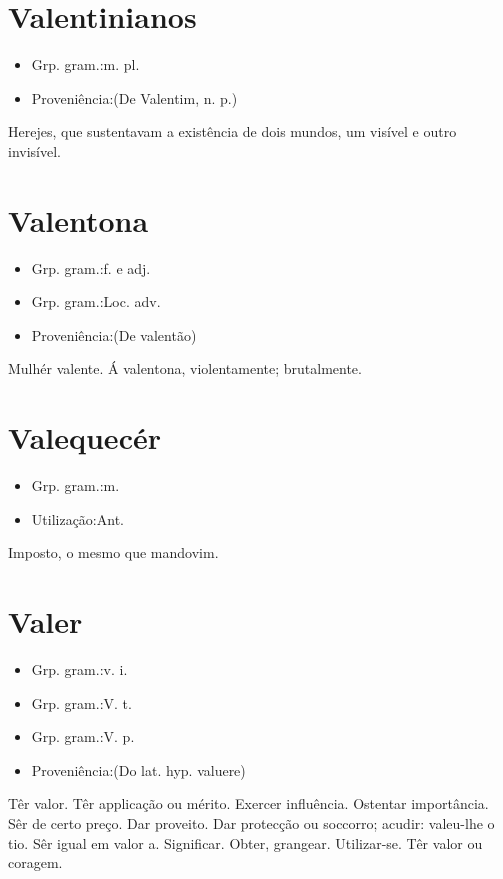 \documentclass{article}
\begin{document}
\section{Valentinianos}
\begin{itemize}
\item {Grp. gram.:m. pl.}
\end{itemize}
\begin{itemize}
\item {Proveniência:(De \textunderscore Valentim\textunderscore , n. p.)}
\end{itemize}
Herejes, que sustentavam a existência de dois mundos, um visível e outro invisível.
\section{Valentona}
\begin{itemize}
\item {Grp. gram.:f.  e  adj.}
\end{itemize}
\begin{itemize}
\item {Grp. gram.:Loc. adv.}
\end{itemize}
\begin{itemize}
\item {Proveniência:(De \textunderscore valentão\textunderscore )}
\end{itemize}
Mulhér valente.
\textunderscore Á valentona\textunderscore , violentamente; brutalmente.
\section{Valequecér}
\begin{itemize}
\item {Grp. gram.:m.}
\end{itemize}
\begin{itemize}
\item {Utilização:Ant.}
\end{itemize}
Imposto, o mesmo que \textunderscore mandovim\textunderscore .
\section{Valer}
\begin{itemize}
\item {Grp. gram.:v. i.}
\end{itemize}
\begin{itemize}
\item {Grp. gram.:V. t.}
\end{itemize}
\begin{itemize}
\item {Grp. gram.:V. p.}
\end{itemize}
\begin{itemize}
\item {Proveniência:(Do lat. hyp. \textunderscore valuere\textunderscore )}
\end{itemize}
Têr valor.
Têr applicação ou mérito.
Exercer influência.
Ostentar importância.
Sêr de certo preço.
Dar proveito.
Dar protecção ou soccorro; acudir: \textunderscore valeu-lhe o tio\textunderscore .
Sêr igual em valor a.
Significar.
Obter, grangear.
Utilizar-se.
Têr valor ou coragem.
\end{document}
